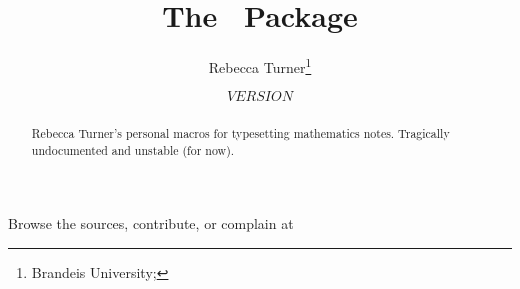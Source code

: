 \documentclass{ltxguidex}
\author{Rebecca Turner\thanks{Brandeis University; \email{rbt@sent.as}}}
\title{The \mn\ Package}
\date{${VERSION}$}
\begin{document}
\maketitle

\begin{abstract}
	Rebecca Turner's personal macros for typesetting mathematics notes.
	Tragically undocumented and unstable (for now).
\end{abstract}

\begin{note}
	Browse the sources, contribute, or complain at \\
\end{note}
\end{document}
